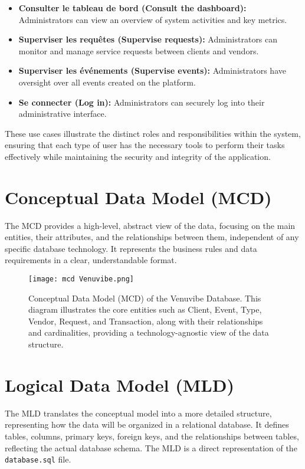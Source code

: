\documentclass{report}
\begin{document}
\begin{itemize}
\begin{itemize}
        \item \textbf{Consulter le tableau de bord (Consult the dashboard):} Administrators can view an overview of system activities and key metrics.
        \item \textbf{Superviser les requêtes (Supervise requests):} Administrators can monitor and manage service requests between clients and vendors.
        \item \textbf{Superviser les événements (Supervise events):} Administrators have oversight over all events created on the platform.
        \item \textbf{Se connecter (Log in):} Administrators can securely log into their administrative interface.
    \end{itemize}
\end{itemize}
These use cases illustrate the distinct roles and responsibilities within the system, ensuring that each type of user has the necessary tools to perform their tasks effectively while maintaining the security and integrity of the application.

\section{Conceptual Data Model (MCD)}
\label{sec:conceptual_data_model}
The MCD provides a high-level, abstract view of the data, focusing on the main entities, their attributes, and the relationships between them, independent of any specific database technology. It represents the business rules and data requirements in a clear, understandable format.

\begin{figure}[htbp]
    \centering
    \texttt{[image: mcd Venuvibe.png]} %
    \caption{Conceptual Data Model (MCD) of the Venuvibe Database. This diagram illustrates the core entities such as Client, Event, Type, Vendor, Request, and Transaction, along with their relationships and cardinalities, providing a technology-agnostic view of the data structure.}
    \label{fig:mcd_diagram}
\end{figure}


\section{Logical Data Model (MLD)}
\label{sec:logical_data_model}
The MLD translates the conceptual model into a more detailed structure, representing how the data will be organized in a relational database. It defines tables, columns, primary keys, foreign keys, and the relationships between tables, reflecting the actual database schema. The MLD is a direct representation of the \texttt{database.sql} file.
\end{document}
